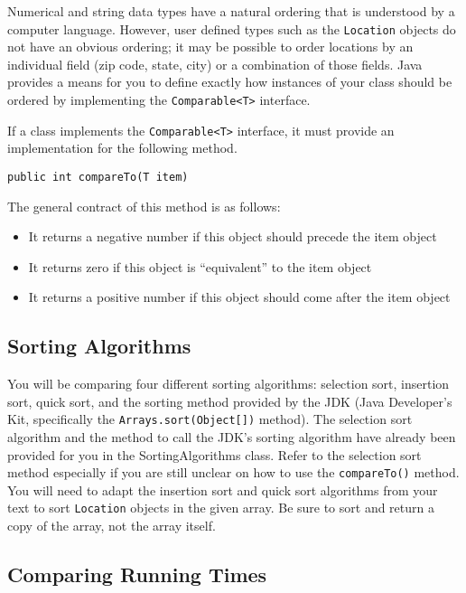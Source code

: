 \documentclass[12pt]{scrartcl}
\begin{document}
Numerical and string data types have a natural ordering that is 
understood by a computer language.  However, user defined types 
such as the \texttt{Location} objects do not have an 
obvious ordering; it may be possible to order locations by an 
individual field (zip code, state, city) or a combination of those 
fields.  Java provides a means for you to define exactly how 
instances of your class should be ordered by implementing the 
\texttt{Comparable<T>} interface.

If a class implements the \texttt{Comparable<T>} interface, 
it must provide an implementation for the following method.

\texttt{public int compareTo(T item)}

The general contract of this method is as follows:
\begin{itemize}
  \item It returns a negative number if this object should precede 
    the item object
  \item It returns zero if this object is ``equivalent'' to the 
    item object
  \item It returns a positive number if this object should come 
    after the item object
\end{itemize}
    
\subsection*{Sorting Algorithms}
    
You will be comparing four different sorting algorithms: selection 
sort, insertion sort, quick sort, and the sorting method provided by 
the JDK (Java Developer's Kit, specifically the 
\texttt{Arrays.sort(Object[])} method).  The selection sort 
algorithm and the method to call the JDK's sorting algorithm have 
already been provided for you in the SortingAlgorithms class.  Refer 
to the selection sort method especially if you are still unclear on 
how to use the \texttt{compareTo()} method.  You will need 
to adapt the insertion sort and quick sort algorithms from your text 
to sort \texttt{Location} objects in the given array.  Be 
sure to sort and return a copy of the array, not the array itself.

\subsection*{Comparing Running Times}
\end{document}
